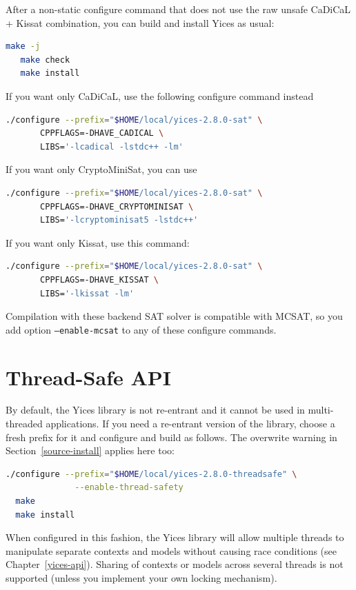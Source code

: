 \documentclass[11pt,twoside,fleqn,openright,titlepage]{cslreport}
\begin{document}
After a non-static configure command that does not use the raw unsafe
CaDiCaL + Kissat combination, you can build and install Yices as usual:
\begin{small}
\begin{lstlisting}[language=sh,deletekeywords={test}]
   make -j
   make check
   make install
\end{lstlisting}
\end{small}
If you want only CaDiCaL, use the following configure command instead
\begin{small}
\begin{lstlisting}[language=sh]
  ./configure --prefix="$HOME/local/yices-2.8.0-sat" \
       CPPFLAGS=-DHAVE_CADICAL \
       LIBS='-lcadical -lstdc++ -lm'
\end{lstlisting}
\end{small}
If you want only CryptoMiniSat, you can use
\begin{small}
\begin{lstlisting}[language=sh]
  ./configure --prefix="$HOME/local/yices-2.8.0-sat" \
       CPPFLAGS=-DHAVE_CRYPTOMINISAT \
       LIBS='-lcryptominisat5 -lstdc++'
\end{lstlisting}
\end{small}
If you want only Kissat, use this command:
\begin{small}
\begin{lstlisting}[language=sh]
  ./configure --prefix="$HOME/local/yices-2.8.0-sat" \
       CPPFLAGS=-DHAVE_KISSAT \
       LIBS='-lkissat -lm'
\end{lstlisting}
\end{small}

Compilation with these backend SAT solver is compatible with MCSAT, so
you add option \texttt{--enable-mcsat} to any of these configure commands.

\section{Thread-Safe API}

By default, the Yices library is not re-entrant and it cannot be used
in multi-threaded applications. If you need a re-entrant version of
the library, choose a fresh prefix for it and configure and build as follows.
The overwrite warning in Section~\ref{source-install} applies here too:
\begin{small}
\begin{lstlisting}[language=sh]
  ./configure --prefix="$HOME/local/yices-2.8.0-threadsafe" \
              --enable-thread-safety
  make
  make install
\end{lstlisting}
\end{small}
When configured in this fashion, the Yices library will allow multiple
threads to manipulate separate contexts and models without causing race
conditions (see Chapter~\ref{yices-api}). Sharing of contexts or
models across several threads is not supported (unless you implement
your own locking mechanism).
\end{document}
